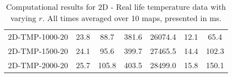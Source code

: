 \documentclass{article}
\begin{document}
\begin{table}[h]
\begin{center}
\begin{tabular}{|l||c|c|c|c|c|c|}
            2D-TMP-1000-20                 & 23.8      & 88.7       & 381.6       & 26074.4  & 12.1      & 65.4       \\
            2D-TMP-1500-20                 & 24.1      & 95.6       & 399.7       & 27465.5  & 14.4      & 102.3      \\
            2D-TMP-2000-20                 & 25.7      & 105.8      & 403.5       & 28499.0  & 15.8      & 150.1      \\
            \hline
        \end{tabular}
        \caption{Computational results for 2D - Real life temperature data with varying $r$. All times averaged over 10 maps, presented in ms.}
    \end{center}
    \end{table}
\restoregeometry
\end{document}
